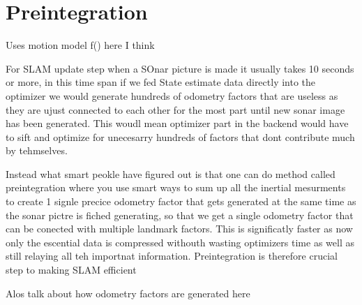 \section{Preintegration}

Uses motion model f() here I think

For SLAM update step when a SOnar picture is made it usually takes 10 seconds or more, in this time span if we fed State estimate data directly into the optimizer we would generate hundreds of odometry factors that are useless as they are ujust connected to each other for the most part until new sonar image has been generated. This woudl mean optimizer part in the backend would have to sift and optimize for unecesarry hundreds of factors that dont contribute much by tehmselves.

Instead what smart peokle have figured out is that one can do method called preintegration where you use smart ways to sum up all the inertial mesurments to create 1 signle precice odometry factor that gets generated at the same time as the sonar pictre is fiched generating, so that we get a single odometry factor that can be conected with multiple landmark factors. This is significatly faster as now only the escential data is compressed withouth wasting optimizers time as well as still relaying all teh importnat information. Preintegration is therefore crucial step to making SLAM efficient

Alos talk about how odometry factors are generated here